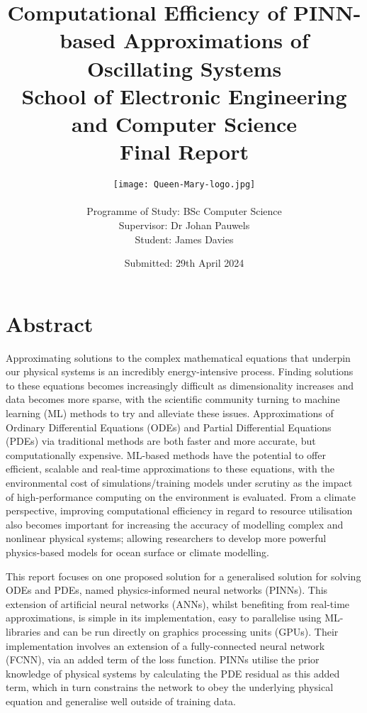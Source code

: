 \documentclass[12pt, openany]{book}
\title{\LARGE %
        Computational Efficiency of PINN-based Approximations of Oscillating Systems \\
        \Large
        \vspace{15pt}
        School of Electronic Engineering and Computer Science \\
        \vspace{15pt}
        Final Report
        \vspace{30pt}
        \vfill
        }
\author{%
        \Large
        \texttt{[image: Queen-Mary-logo.jpg]} \\
        \vspace{15pt} \\
        Programme of Study: BSc Computer Science \\
        Supervisor: Dr Johan Pauwels \\
        Student: James Davies \\
        }
\date{Submitted: 29th April 2024}
\begin{document}
\maketitle


\thispagestyle{empty}
\chapter*{Abstract}

Approximating solutions to the complex mathematical equations that underpin our physical systems is an incredibly energy-intensive process. Finding solutions to these equations becomes increasingly difficult as dimensionality increases and data becomes more sparse, with the scientific community turning to machine learning (ML) methods to try and alleviate these issues. Approximations of Ordinary Differential Equations (ODEs) and Partial Differential Equations (PDEs) via traditional methods are both faster and more accurate, but computationally expensive. ML-based methods have the potential to offer efficient, scalable and real-time approximations to these equations, with the environmental cost of simulations/training models under scrutiny as the impact of high-performance computing on the environment is evaluated. From a climate perspective, improving computational efficiency in regard to resource utilisation also becomes important for increasing the accuracy of modelling complex and nonlinear physical systems; allowing researchers to develop more powerful physics-based models for ocean surface or climate modelling. \vspace{13pt}

This report focuses on one proposed solution for a generalised solution for solving ODEs and PDEs, named physics-informed neural networks (PINNs). This extension of artificial neural networks (ANNs), whilst benefiting from real-time approximations, is simple in its implementation, easy to parallelise using ML-libraries and can be run directly on graphics processing units (GPUs). Their implementation involves an extension of a fully-connected neural network (FCNN), via an added term of the loss function. PINNs utilise the prior knowledge of physical systems by calculating the PDE residual as this added term, which in turn constrains the network to obey the underlying physical equation and generalise well outside of training data. \vspace{13pt}
\end{document}

